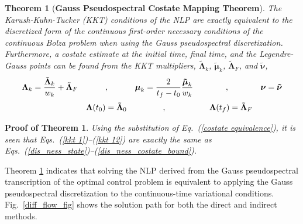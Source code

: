 \documentclass[10pt,final]{report}
\newtheorem{thm}{Theorem}
\newtheorem{Thmproof}{Proof of Theorem}
\begin{document}
\begin{thm}[\bf{Gauss Pseudospectral Costate Mapping Theorem}]\label{cmp_thm}
The Karush-Kuhn-Tucker (KKT) conditions of the NLP are exactly
equivalent to the discretized form of the continuous first-order
necessary conditions of the continuous Bolza problem when using the Gauss
pseudospectral discretization.  Furthermore, a costate estimate at the
initial time, final time, and the Legendre-Gauss points can be found
from the KKT multipliers, $\boldsymbol{\tilde \Lambda}_k$,
$\boldsymbol{\tilde \mu}_k$, $\boldsymbol{\tilde \Lambda}_F$, and
$\boldsymbol{\tilde \nu}$,
\begin{equation}\label{costate equivalence}\begin{array}{ccccc}
    \boldsymbol{\Lambda}_k = \displaystyle\frac{\boldsymbol{\tilde
        \Lambda}_k}{w_k} + \boldsymbol{\tilde \Lambda}_F  & , &
    \boldsymbol{\mu}_k = \displaystyle\frac{2}{t_f -
      t_0}\frac{\boldsymbol{\tilde \mu}_k}{w_k} & , &
    \boldsymbol{\nu} = \boldsymbol{\tilde\nu}  \vspace{6pt} \\
    & \boldsymbol{\Lambda}(t_0) = \boldsymbol{\tilde\Lambda}_0  & , &
    \quad \boldsymbol{\Lambda}(t_f) = \boldsymbol{\tilde\Lambda}_F
  \end{array}
\end{equation}
\end{thm}
\begin{Thmproof}
Using the substitution of Eq.~(\ref{costate equivalence}), it is seen
that Eqs.~(\ref{kkt 1})--(\ref{kkt 12}) are exactly the same as
Eqs.~(\ref{dis_ness_state})--(\ref{dis_ness_costate_bound}).
\end{Thmproof}
Theorem \ref{cmp_thm} indicates that solving the NLP derived from
the Gauss pseudospectral transcription of the optimal control problem
is equivalent to applying the Gauss pseudospectral discretization to
the continuous-time variational conditions.  Fig.~\ref{diff_flow_fig}
shows the solution path for both the direct and indirect methods.
\end{document}
